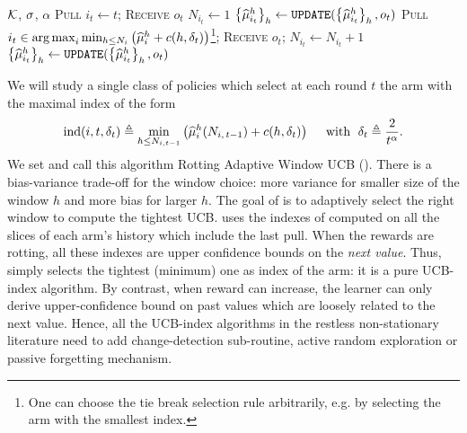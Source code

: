  \begin{minipage}{\textwidth}
\renewcommand*\footnoterule{}
\begin{savenotes}
\begin{algorithm}[H]
\caption{\RUCB}
\label{alg:RAWUCB}
\begin{algorithmic}[1]
\Require $\mathcal{K}$,  $\sigma$, $\alpha$
	\State \textsc{Pull}  $i_t \gets t$; \textsc{Receive} $o_{t}$
	\State $N_{i_t} \gets 1$
	\State $\left\{\widehat{\mu}_{i_t}^h\right\}_h \gets \normalfont \texttt{UPDATE}(\left\{\widehat{\mu}_{i_t}^h\right\}_h, o_t)$ \label{algline:raw-update1}
\EndFor
{}
	\State \textsc{Pull}  $i_t \in \operatorname*{arg\,max}_i \min_{h \leq N_{i}}\left(\widehat{\mu}_i^h + c(h, \delta_t)\right) $\footnote{One can choose the tie break selection rule arbitrarily, e.g. by selecting the arm with the smallest index.}; \textsc{Receive} $o_{t}${\footnotesize {}}; \label{algline:raw-pull}
	\State  $N_{i_t} \gets N_{i_t} +1$
	\State $\left\{\widehat{\mu}_{i_t}^h\right\}_h \gets \normalfont \texttt{UPDATE}(\left\{\widehat{\mu}_{i_t}^h\right\}_h, o_t)$\label{algline:raw-update2}
\EndFor
\end{algorithmic}
\end{algorithm}
\end{savenotes}
\end{minipage}



We will study a single class of policies which select at each round $t$ the arm with the maximal index of the form
\begin{align}
\label{eq:xindex}
\operatorname{ind}(i,t, \delta_{t}) \triangleq \min_{h\leq N_{i,t-1}}\left( {\widehat{\mu}}_i^h(N_{i,\,t-1}) + c(h,\delta_{t})\right)\quad \text{ with } \; \delta_{t} \triangleq \frac{2}{t^\alpha} .
\end{align}
We set  and  call this algorithm Rotting Adaptive Window UCB (\RUCB). There is  a bias-variance trade-off for the window choice: more variance for smaller size of the window $h$ and more bias for larger $h$. The goal of \RUCB is to adaptively select the right window to compute the tightest UCB. \RUCB uses the indexes of \UCBone computed on all the slices of each arm's history which include the last pull. When the rewards are rotting, all these indexes are upper confidence bounds on the \textit{next value}.  Thus, \RUCB simply selects the tightest (minimum) one as index of the arm: it is a pure UCB-index algorithm. By contrast, when reward can increase, the learner can only derive upper-confidence bound on past values which are loosely related to the next value. Hence, all the UCB-index algorithms in the restless non-stationary literature need to add change-detection sub-routine, active random exploration or passive forgetting mechanism. 

